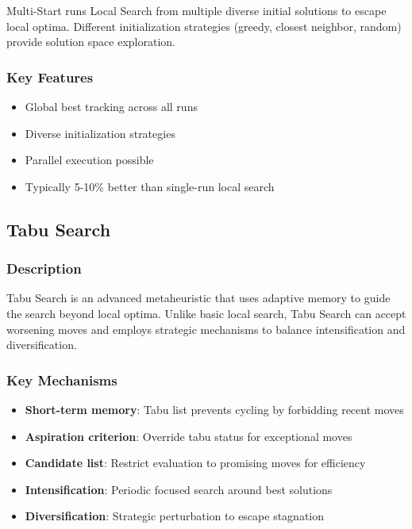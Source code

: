 \documentclass[11pt,a4paper]{article}
\begin{document}
Multi-Start runs Local Search from multiple diverse initial solutions to escape local optima. Different initialization strategies (greedy, closest neighbor, random) provide solution space exploration.

\subsubsection{Key Features}
\begin{itemize}
  \item Global best tracking across all runs
  \item Diverse initialization strategies
  \item Parallel execution possible
  \item Typically 5-10\% better than single-run local search
\end{itemize}

\subsection{Tabu Search}

\subsubsection{Description}

Tabu Search \cite{glover1997} is an advanced metaheuristic that uses adaptive memory to guide the search beyond local optima. Unlike basic local search, Tabu Search can accept worsening moves and employs strategic mechanisms to balance intensification and diversification.

\subsubsection{Key Mechanisms}
\begin{itemize}
  \item \textbf{Short-term memory}: Tabu list prevents cycling by forbidding recent moves
  \item \textbf{Aspiration criterion}: Override tabu status for exceptional moves
  \item \textbf{Candidate list}: Restrict evaluation to promising moves for efficiency
  \item \textbf{Intensification}: Periodic focused search around best solutions
  \item \textbf{Diversification}: Strategic perturbation to escape stagnation
\end{itemize}
\end{document}
